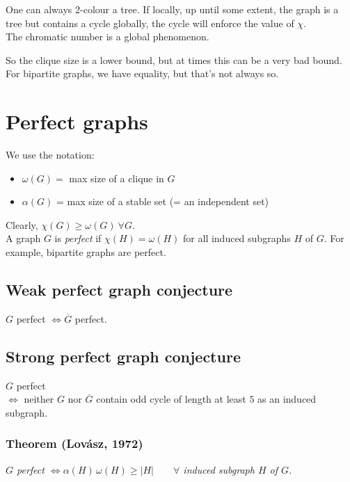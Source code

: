 		One can always 2-colour a tree. If locally, up until some extent, the graph is a tree but contains a cycle globally, the cycle will enforce the value of $\chi$.\\
		
		The chromatic number is a global phenomenon.
		
	So the clique size is a lower bound, but at times this can be a very bad bound. For bipartite graphs, we have equality, but that's not always so.
	
	\section{Perfect graphs}
		
		We use the notation:
		\begin{itemize}
			\item $\omega(G) = $ max size of a clique in $G$
			\item $\alpha(G)$ = max size of a stable set (= an independent set) 
		\end{itemize}
		
		Clearly, $\chi(G) \geq \omega(G) ~\forall G$.\\
		
		A graph $G$ is \textit{perfect} if $\chi(H) = \omega(H)$ for all induced subgraphs $H$ of $G$. For example, bipartite graphs are perfect.\\

		

\subsection{Weak perfect graph conjecture}
$G$ perfect $\iff \overline{G}$ perfect.

\subsection{Strong perfect graph conjecture}
$G$ perfect\\
$\iff$ neither $G$ nor $\overline{G}$ contain odd cycle of length at least $5$
as an induced subgraph.

	
	


	\subsubsection{Theorem (Lovász, 1972)}
	\textit{$G$ perfect
$\iff \alpha(H)\,\omega(H) \geq |H|
\qquad\forall$ induced subgraph $H$ of $G$.\\}

